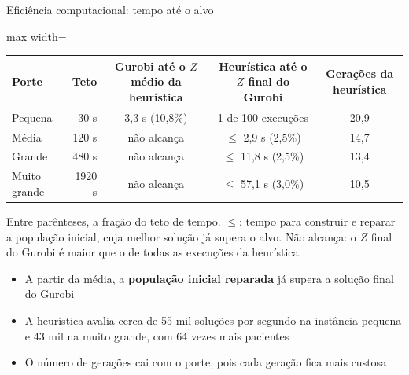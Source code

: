 \documentclass[aspectratio=169,10pt]{beamer}
\newcommand{\framerefs}{}
\newcommand{\slidecites}[1]{\gdef\framerefs{Referências: \cite{#1}}}
\gdef\framerefs{}%
\begin{document}
\begin{frame}{Eficiência computacional: tempo até o alvo}
    \slidecites{aiex2007ttt}
    \centering
    \small
    \begin{adjustbox}{max width=\textwidth}
    \begin{tabular}{lrccc}
        \toprule
        \textbf{Porte} & \textbf{Teto} & \textbf{Gurobi até o $Z$ médio da heurística} & \textbf{Heurística até o $Z$ final do Gurobi} & \textbf{Gerações da heurística} \\
        \midrule
        Pequena      & 30 s   & 3,3 s (10,8\%) & 1 de 100 execuções       & 20,9 \\
        Média        & 120 s  & não alcança    & $\leq$ 2,9 s (2,5\%)     & 14,7 \\
        Grande       & 480 s  & não alcança    & $\leq$ 11,8 s (2,5\%)    & 13,4 \\
        Muito grande & 1920 s & não alcança    & $\leq$ 57,1 s (3,0\%)    & 10,5 \\
        \bottomrule
    \end{tabular}
    \end{adjustbox}

    \vspace{0.15cm}
    {\scriptsize Entre parênteses, a fração do teto de tempo. $\leq$: tempo para construir e reparar a população inicial, cuja melhor solução já supera o alvo. Não alcança: o $Z$ final do Gurobi é maior que o de todas as execuções da heurística.\par}

    \vspace{0.35cm}
    \normalsize
    \begin{itemize}
        \item A partir da média, a \textbf{população inicial reparada} já supera a solução final do Gurobi
        \item A heurística avalia cerca de 55 mil soluções por segundo na instância pequena e 43 mil na muito grande, com 64 vezes mais pacientes
        \item O número de gerações cai com o porte, pois cada geração fica mais custosa
    \end{itemize}
\end{frame}
\end{document}
